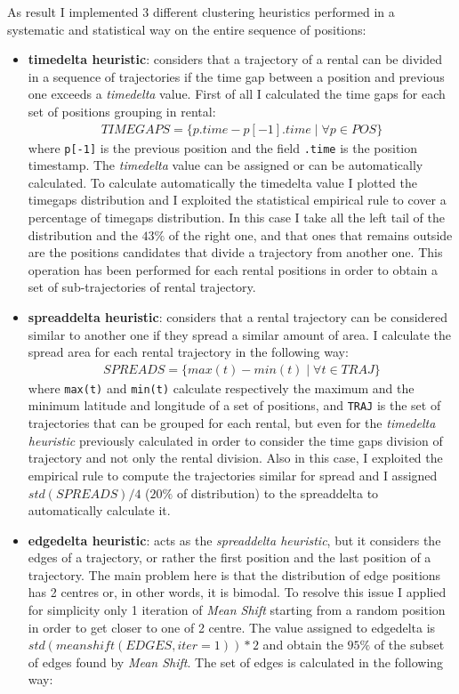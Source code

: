 As result I implemented 3 different clustering heuristics performed in a systematic and statistical way on the entire sequence of positions:
\begin{itemize}
	\item \textbf{timedelta heuristic}: considers that a trajectory of a rental can be divided in a sequence of trajectories if the time gap between a position and previous one exceeds a \textit{timedelta} value. First of all I calculated the time gaps for each set of positions grouping in rental: 
	\begin{align}
		TIMEGAPS = \{p.time - p[-1].time \mid \forall p \in POS \}
	\end{align}
	where \verb|p[-1]| is the previous position and the field \verb|.time| is the position timestamp. The \textit{timedelta} value can be assigned or can be automatically calculated. To calculate automatically the timedelta value I plotted the timegaps distribution and I exploited the statistical empirical rule to cover a percentage of timegaps distribution. In this case I take all the left tail of the distribution and the $43\%$ of the right one, and that ones that remains outside are the positions candidates that divide a trajectory from another one. This operation has been performed for each rental positions in order to obtain a set of sub-trajectories of rental trajectory.
	\item \textbf{spreaddelta heuristic}: considers that a rental trajectory can be considered similar to another one if they spread a similar amount of area. I calculate the spread area for each rental trajectory in the following way: 
	\begin{align}
		SPREADS = \{max(t) - min(t) \mid \forall t \in TRAJ \}
	\end{align}
	where \verb|max(t)| and \verb|min(t)| calculate respectively the maximum and the minimum latitude and longitude of a set of positions, and \verb|TRAJ| is the set of trajectories that can be grouped for each rental, but even for the \textit{timedelta heuristic} previously calculated in order to consider the time gaps division of trajectory and not only the rental division. Also in this case, I exploited the empirical rule to compute the trajectories similar for spread and I assigned $std(SPREADS) / 4$ ($20\%$ of distribution) to the spreaddelta to automatically calculate it. 
	\item \textbf{edgedelta heuristic}: acts as the \textit{spreaddelta heuristic}, but it considers the edges of a trajectory, or rather the first position and the last position of a trajectory. The main problem here is that the distribution of edge positions has 2 centres or, in other words, it is bimodal. To resolve this issue I applied for simplicity only 1 iteration of \textit{Mean Shift} starting from a random position in order to get closer to one of 2 centre. The value assigned to edgedelta is $std(meanshift(EDGES, iter=1)) * 2$ and obtain the $95\%$ of the subset of edges found by \textit{Mean Shift}. The set of edges is calculated in the following way: 

\end{itemize}
